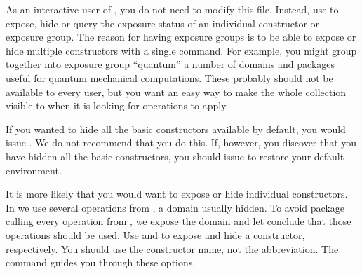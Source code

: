 As an interactive user of \Language{}, you do not need to modify
this file.
Instead, use  to expose, hide or query the exposure
status of an individual constructor or exposure group.
The reason for having exposure groups is to be able to expose or hide
multiple constructors with a single command.
For example, you might group together into exposure group ``quantum'' a
number of domains and packages useful for quantum mechanical computations.
These probably should not be available to every user, but you want an easy
way to make the whole collection visible to \Language{} when it is looking
for operations to apply.

If you wanted to hide all the basic constructors available by default, you
would issue .
 We do not recommend that you do this.
If, however, you discover that you have hidden all the basic constructors,
you should issue  to restore your
default environment.

It is more likely that you would want to expose or hide individual
constructors.
In  we use several operations from
, a domain usually hidden.
To avoid package calling every operation from , we
expose the domain and let \Language{} conclude that those operations should
be used.
Use  and  to expose and hide a constructor, respectively.
You should use the constructor name, not the abbreviation.
The  command guides you through these options.

